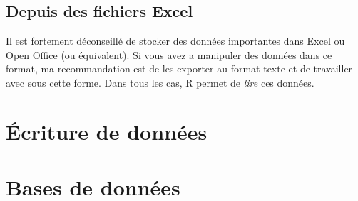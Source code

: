 \subsection{Depuis des fichiers Excel}

Il est fortement déconseillé de stocker des données importantes dans Excel ou Open Office (ou équivalent).
Si vous avez a manipuler des données dans ce format, ma recommandation est de les exporter au format texte et de travailler avec sous cette forme.
Dans tous les cas, R permet de \emph{lire} ces données.

\section{Écriture de données}

\section{Bases de données}
